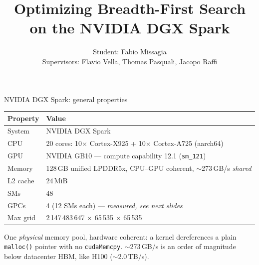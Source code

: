 \documentclass[aspectratio=169, numbering=fraction]{beamer}
\title{Optimizing Breadth-First Search on the NVIDIA DGX Spark}
\date{}
\author[Fabio Missagia]{Student: Fabio Missagia \\ Supervisors: Flavio Vella, Thomas Pasquali, Jacopo Raffi}
\institute{Department of Information Engineering and Computer Science, University of Trento}
\begin{document}
\maketitle

\begin{frame}{NVIDIA DGX Spark: general properties}
  \vspace{0.7em}
  \small
  \begin{tabular}{ll}
    \toprule
    \textbf{Property} & \textbf{Value} \\
    \midrule
    System        & NVIDIA DGX Spark \\
    CPU           & 20 cores: 10$\times$ Cortex-X925 + 10$\times$ Cortex-A725 (aarch64) \\
    GPU           & NVIDIA GB10 --- compute capability 12.1 (\texttt{sm\_121}) \\
    Memory        & 128\,GB unified LPDDR5x, CPU--GPU coherent, $\sim$273\,GB/s \emph{shared} \\
    L2 cache      & 24\,MiB \\
    SMs           & 48 \\
    GPCs          & 4 (12 SMs each) --- \emph{measured, see next slides} \\
    Max grid      & 2\,147\,483\,647 $\times$ 65\,535 $\times$ 65\,535 \\
    \bottomrule
  \end{tabular}

  \vspace{0.4em}
  \footnotesize
  One \emph{physical} memory pool, hardware coherent: a kernel dereferences a plain
  \texttt{malloc()} pointer with no \texttt{cudaMemcpy}. $\sim$273\,GB/s is an order of
  magnitude below datacenter HBM, like H100 ($\sim$2.0\,TB/s).

\end{frame}
\end{document}
